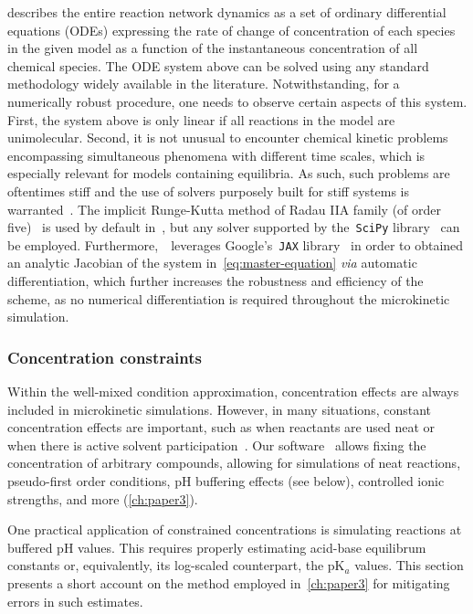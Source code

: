  describes the entire reaction network dynamics
as a set of ordinary differential equations (ODEs) expressing the rate of change of concentration of each species in the given model
as a function of the instantaneous concentration of all chemical species.
The ODE system above can be solved using any standard methodology widely available in the literature.
Notwithstanding,
for a numerically robust procedure,
one needs to observe certain aspects of this system.
First,
the system above is only linear if all reactions in the model are unimolecular.
Second,
it is not unusual to encounter chemical kinetic problems
encompassing
simultaneous phenomena with different time scales,
which is especially relevant for models containing equilibria.
As such,
such problems are oftentimes stiff and the use of solvers purposely built  for stiff systems is warranted~\cite{Curtiss_1952,Hairer_1991,Petzold_1983}.
The implicit Runge-Kutta method of Radau IIA family (of order five)~\cite{Hairer_1996} is used by default in~\overreact{},
but any solver supported by the~\texttt{SciPy} library~\cite{Virtanen_2020} can be employed.
Furthermore,~\overreact{}~leverages Google's~\texttt{JAX} library~\cite{jax2018github}
in order to
obtained an analytic Jacobian of the system in~\cref{eq:master-equation} \emph{via} automatic differentiation,
which further increases the robustness and efficiency of the scheme,
as no numerical differentiation is required throughout the microkinetic simulation.

\subsubsection{Concentration constraints}%
\label{sec:microkinetic-constraints}

Within the well-mixed condition approximation,
concentration effects are always included in microkinetic simulations.
However,
in many situations,
constant concentration effects are important,
such as when reactants are used neat or when there is active solvent participation~\cite{Ryu_2018}.
Our software~\overreact{} allows fixing the concentration of arbitrary compounds,
allowing for simulations of neat reactions,
pseudo-first order conditions,
pH buffering effects (see below),
controlled ionic strengths,
and more (\cref{ch:paper3}).

%
\label{sec:pka}

One practical application of constrained concentrations is simulating reactions at buffered pH values.
This requires properly estimating acid-base equilibrum constants or,
equivalently,
its log-scaled counterpart,
the pK$_a$ values.
This section presents a short account on the method employed in~\cref{ch:paper3}
for mitigating errors in such estimates.

